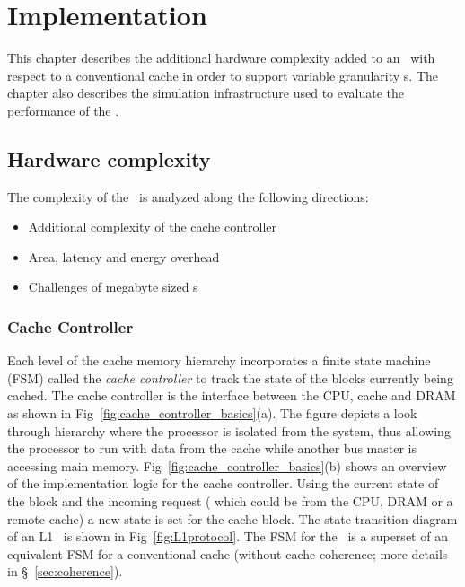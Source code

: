 
%
%

\chapter{Implementation}
\label{chap:hardware_complexity_and_simulation}

This chapter describes the additional hardware complexity added to an \AC\ with respect to a conventional cache in order to support variable granularity \AB{}s. The chapter also describes the simulation infrastructure used to evaluate the performance of the \AC{}.

\section{Hardware complexity}  
\label{sec:hardware_complexity}

The complexity of the \AC\ is analyzed along the following directions:
\begin{itemize}
  \item Additional complexity of the cache controller
  \item Area, latency and energy overhead
  \item Challenges of megabyte sized \AC{}s
\end{itemize}


\subsection{Cache Controller} 

Each level of the cache memory hierarchy incorporates a finite state machine (FSM) called the \textit{cache controller} to track the state of the blocks currently being cached. The cache controller is the interface between the CPU, cache and DRAM as shown in Fig~\ref{fig:cache_controller_basics}(a). The figure depicts a look through hierarchy where the processor is isolated from the system, thus allowing the processor to run with data from the cache while another bus master is accessing main memory. Fig~\ref{fig:cache_controller_basics}(b) shows an overview of the implementation logic for the cache controller. Using the current state of the block and the incoming request ( which could be from the CPU, DRAM or a remote cache) a new state is set for the cache block. The state transition diagram of an L1 \AC\ is shown in Fig~\ref{fig:L1protocol}. The FSM for the \AC\ is a superset of an equivalent FSM for a conventional cache (without cache coherence; more details in \S~\ref{sec:coherence}).

